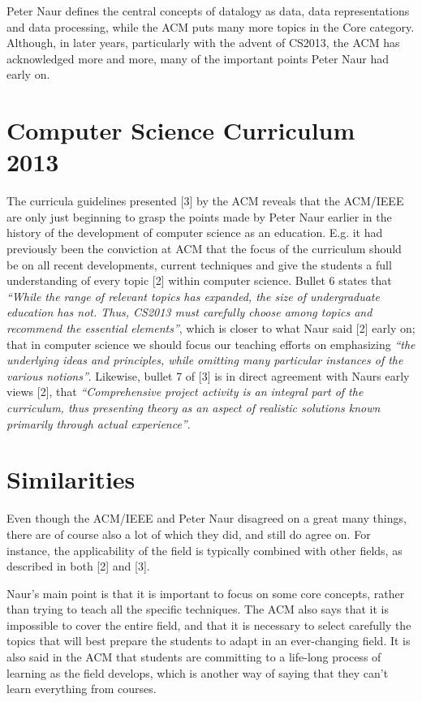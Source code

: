 \documentclass{article}
\begin{document}
Peter Naur defines the central concepts of datalogy as data, data representations and data processing, while the ACM
puts many more topics in the Core category. Although, in later years, particularly with the advent of CS2013, the ACM
has acknowledged more and more, many of the important points Peter Naur had early on.

\section{Computer Science Curriculum 2013}
The curricula guidelines presented [3] by the ACM reveals that the ACM/IEEE are only just beginning to grasp the points
made by Peter Naur earlier in the history of the development of computer science as an education. E.g. it had previously
been the conviction at ACM that the focus of the curriculum should be on all recent developments, current techniques and
give the students a full understanding of every topic [2] within computer science. Bullet 6 states that \emph{``While the range
of relevant topics has expanded, the size of undergraduate education has not. Thus, CS2013 must carefully choose among
topics and recommend the essential elements''}, which is closer to what Naur said [2] early on; that in computer science
we should focus our teaching efforts on emphasizing \emph{``the underlying ideas and principles, while omitting many particular
instances of the various notions''}. Likewise, bullet 7 of [3] is in direct agreement with Naurs early views [2], that
\emph{``Comprehensive project activity is an integral part of the curriculum, thus presenting theory as an aspect of realistic
solutions known primarily through actual experience''}.

\section{Similarities}
Even though the ACM/IEEE and Peter Naur disagreed on a great many things, there are of course also a lot of which they
did, and still do agree on. For instance, the applicability of the field is typically combined with other fields, as
described in both [2] and [3].

Naur’s main point is that it is important to focus on some core concepts, rather than trying to teach all the specific
techniques. The ACM also says that it is impossible to cover the entire field, and that it is necessary to select
carefully the topics that will best prepare the students to adapt in an ever-changing field. It is also said in the ACM
that students are committing to a life-long process of learning as the field develops, which is another way of saying
that they can’t learn everything from courses.
\end{document}
